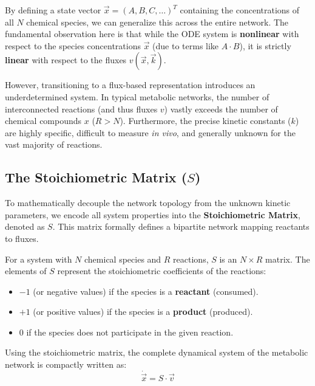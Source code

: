 By defining a state vector \(\vec{x} = (A, B, C, \dots)^T\) containing the concentrations of all \(N\) chemical species, we can generalize this across the entire network. The fundamental observation here is that while the ODE system is \textbf{nonlinear} with respect to the species concentrations \(\vec{x}\) (due to terms like \(A \cdot B\)), it is strictly \textbf{linear} with respect to the fluxes \(v(\vec{x}, \vec{k})\).

However, transitioning to a flux-based representation introduces an underdetermined system. In typical metabolic networks, the number of interconnected reactions (and thus fluxes \(v\)) vastly exceeds the number of chemical compounds \(x\) (\(R > N\)). Furthermore, the precise kinetic constants (\(k\)) are highly specific, difficult to measure \textit{in vivo}, and generally unknown for the vast majority of reactions.

\subsection{The Stoichiometric Matrix (\(S\))}
\label{subsec:stoichiometric_matrix}

To mathematically decouple the network topology from the unknown kinetic parameters, we encode all system properties into the \textbf{Stoichiometric Matrix}, denoted as \(S\). This matrix formally defines a bipartite network mapping reactants to fluxes.

For a system with \(N\) chemical species and \(R\) reactions, \(S\) is an \(N \times R\) matrix. The elements of \(S\) represent the stoichiometric coefficients of the reactions:
\begin{itemize}
    \item \(-1\) (or negative values) if the species is a \textbf{reactant} (consumed).
    \item \(+1\) (or positive values) if the species is a \textbf{product} (produced).
    \item \(0\) if the species does not participate in the given reaction.
\end{itemize}


Using the stoichiometric matrix, the complete dynamical system of the metabolic network is compactly written as:
\[
    \dot{\vec{x}} = S \cdot \vec{v}
\]

